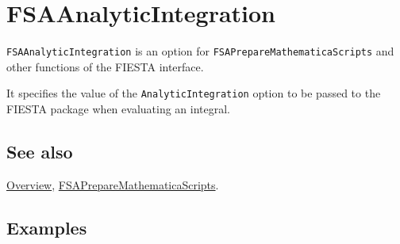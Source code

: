 \documentclass[../FeynHelpersManual.tex]{subfiles}
\begin{document}
\hypertarget{fsaanalyticintegration}{
\section{FSAAnalyticIntegration}\label{fsaanalyticintegration}}

\texttt{FSAAnalyticIntegration} is an option for
\texttt{FSAPrepareMathematicaScripts} and other functions of the FIESTA
interface.

It specifies the value of the \texttt{AnalyticIntegration} option to be
passed to the FIESTA package when evaluating an integral.

\subsection{See also}

\hyperlink{toc}{Overview},
\hyperlink{fsapreparemathematicascripts}{FSAPrepareMathematicaScripts}.

\subsection{Examples}
\end{document}

